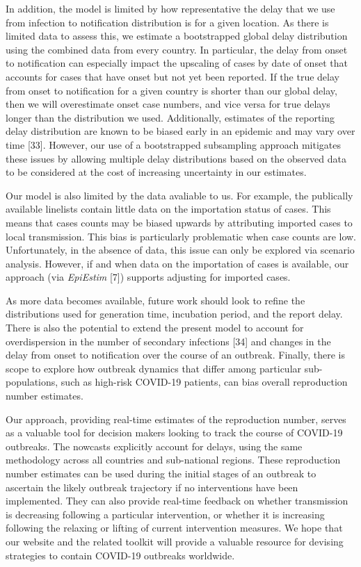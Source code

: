 \documentclass[
]{article}
\begin{document}
In addition, the model is limited by how representative the delay that
we use from infection to notification distribution is for a given
location. As there is limited data to assess this, we estimate a
bootstrapped global delay distribution using the combined data from
every country. In particular, the delay from onset to notification can
especially impact the upscaling of cases by date of onset that accounts
for cases that have onset but not yet been reported. If the true delay
from onset to notification for a given country is shorter than our
global delay, then we will overestimate onset case numbers, and vice
versa for true delays longer than the distribution we used.
Additionally, estimates of the reporting delay distribution are known to
be biased early in an epidemic and may vary over time {[}33{]}. However,
our use of a bootstrapped subsampling approach mitigates these issues by
allowing multiple delay distributions based on the observed data to be
considered at the cost of increasing uncertainty in our estimates.

Our model is also limited by the data avaliable to us. For example, the
publically available linelists contain little data on the importation
status of cases. This means that cases counts may be biased upwards by
attributing imported cases to local transmission. This bias is
particularly problematic when case counts are low. Unfortunately, in the
absence of data, this issue can only be explored via scenario analysis.
However, if and when data on the importation of cases is available, our
approach (via \emph{EpiEstim} {[}7{]}) supports adjusting for imported
cases.

As more data becomes available, future work should look to refine the
distributions used for generation time, incubation period, and the
report delay. There is also the potential to extend the present model to
account for overdispersion in the number of secondary infections
{[}34{]} and changes in the delay from onset to notification over the
course of an outbreak. Finally, there is scope to explore how outbreak
dynamics that differ among particular sub-populations, such as high-risk
COVID-19 patients, can bias overall reproduction number estimates.

Our approach, providing real-time estimates of the reproduction number,
serves as a valuable tool for decision makers looking to track the
course of COVID-19 outbreaks. The nowcasts explicitly account for
delays, using the same methodology across all countries and sub-national
regions. These reproduction number estimates can be used during the
initial stages of an outbreak to ascertain the likely outbreak
trajectory if no interventions have been implemented. They can also
provide real-time feedback on whether transmission is decreasing
following a particular intervention, or whether it is increasing
following the relaxing or lifting of current intervention measures. We
hope that our website and the related toolkit will provide a valuable
resource for devising strategies to contain COVID-19 outbreaks
worldwide.
\end{document}
